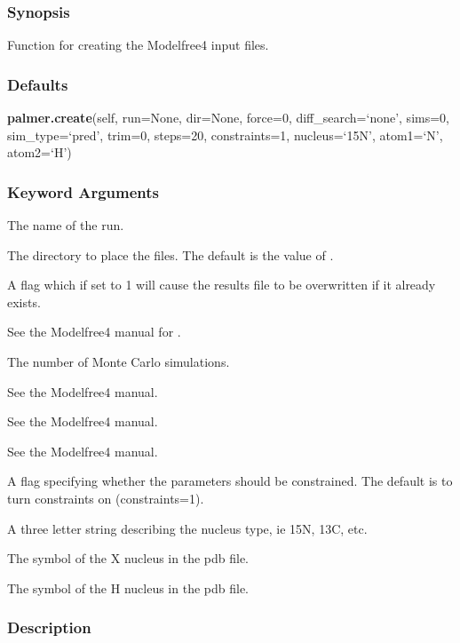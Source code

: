 \subsubsection{Synopsis}

Function for creating the Modelfree4 input files.

\subsubsection{Defaults}

\textsf{\textbf{palmer.create}(self, run=None, dir=None, force=0, diff\_search=`none', sims=0, sim\_type=`pred', trim=0, steps=20, constraints=1, nucleus=`15N', atom1=`N', atom2=`H')}


\subsubsection{Keyword Arguments}


  The name of the run.

  The directory to place the files.  The default is the value of 
.

  A flag which if set to 1 will cause the results file to be overwritten if it already exists.

  See the Modelfree4 manual for 
.

  The number of Monte Carlo simulations.

  See the Modelfree4 manual.

  See the Modelfree4 manual.

  See the Modelfree4 manual.

  A flag specifying whether the parameters should be constrained.  The default is to turn constraints  on (constraints=1).

  A three letter string describing the nucleus type, ie 15N, 13C, etc.

  The symbol of the X nucleus in the pdb file.

  The symbol of the H nucleus in the pdb file.

\subsubsection{Description}

